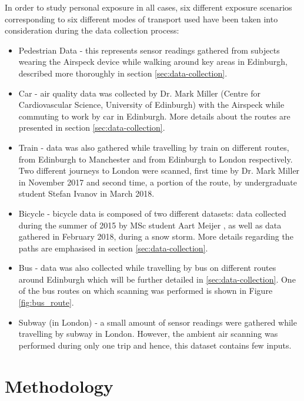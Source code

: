 \documentclass[bsc,frontabs,twoside,singlespacing, parskip,deptreport]{infthesis}     %
\begin{document}
In order to study personal exposure in all cases, six different exposure scenarios corresponding to six different modes of transport used have been taken into consideration during the data collection process:

\begin{itemize}

\item Pedestrian Data - this represents sensor readings gathered from subjects wearing the Airspeck device while walking around key areas in Edinburgh, described more thoroughly in section \ref{sec:data-collection}.

\item Car - air quality data was collected by Dr. Mark Miller (Centre for Cardiovascular Science, University of Edinburgh) with the Airspeck while commuting to work by car in Edinburgh. More details about the routes are presented in section \ref{sec:data-collection}.

\item Train - data was also gathered while travelling by train on different routes, from Edinburgh to Manchester and from Edinburgh to London respectively. Two different journeys to London were scanned, first time by Dr. Mark Miller in November 2017 and second time, a portion of the route, by undergraduate student Stefan Ivanov \cite{ivanov} in March 2018.

\item Bicycle - bicycle data is composed of two different datasets: data  collected during the summer of 2015 by MSc student Aart Meijer \cite{Meijer2015}, as well as data gathered in February 2018, during a snow storm. More details regarding the paths are emphasised in section \ref{sec:data-collection}.

\item Bus - data was also collected while travelling by bus on different routes around Edinburgh which will be further detailed in \ref{sec:data-collection}. One of the bus routes on which scanning was performed is shown in Figure \ref{fig:bus_route}.

\item Subway (in London) - a small amount of sensor readings were gathered while travelling by subway in London. However, the ambient air scanning was performed during only one trip and hence, this dataset contains few inputs.
\end{itemize}

\chapter{Methodology}
\end{document}
